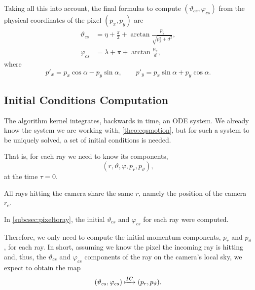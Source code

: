 Taking all this into account, the final formulas to compute $(\vartheta_{cs}, \varphi_{cs})$ from the physical coordinates of the pixel $(p_x, p_y)$ are
\begin{align}
\label{eq:pinhole1}
\vartheta_{cs} &= \eta + \frac{\pi}{2} + \arctan{\frac{p_y}{\sqrt{p_x^2 + d^2}}}, \\
\label{eq:pinhole2}
\varphi_{cs} &= \lambda + \pi + \arctan{\frac{p_x}{d}},
\end{align}
where
\[
p'_x = p_x\cos\alpha - p_y\sin\alpha, \qquad
p'_y = p_x\sin\alpha + p_y\cos\alpha.
\]

\subsection{Initial Conditions Computation}
\label{sec:initcond}

The algorithm kernel integrates, backwards in time, an \ac{ODE} system. We already know the system we are working with, \autoref{theo:eqsmotion}, but for such a system to be uniquely solved, a set of initial conditions is needed.

That is, for each ray we need to know its components, \[(r, \vartheta, \varphi, p_r, p_\vartheta),\] at the time $\tau = 0$.

All rays hitting the camera share the same $r$, namely the position of the camera $r_c$.

In \autoref{subcsec:pixeltoray}, the initial $\vartheta_{cs}$ and $\varphi_{cs}$ for each ray were computed.

Therefore, we only need to compute the initial momentum components, $p_r$ and $p_\vartheta$, for each ray. In short, assuming we know the pixel the incoming ray is hitting and, thus, the $\vartheta_{cs}$ and $\varphi_{cs}$ components of the ray on the camera's local sky, we expect to obtain the map
\[
(\vartheta_{cs}, \varphi_{cs}) \xmapsto{IC} (p_r, p_\vartheta).
\]

